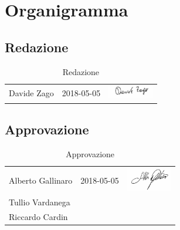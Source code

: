 \section{Organigramma}
	\subsection{Redazione}
	\begin{table}[H]
	\centering
	\begin{tabular}{|p{4cm}|C{4cm}|C{5cm}|}
	\hline
		 & & \\
		\hline
		Davide Zago & 2018-05-05 & \includegraphics[width=2cm]{../../CommonImages/firme/davide.png} \\
		\hline
	\end{tabular}
	\caption{Redazione}
	\end{table}
	
	\subsection{Approvazione}
	\begin{table}[H]
		\centering
		\begin{tabular}{|p{4cm}|C{4cm}|C{5cm}|}
			\hline
			 & & \\
			\hline			
			Alberto Gallinaro & 2018-05-05 & \includegraphics[width=2cm]{../../CommonImages/firme/alberto.png}  \\
			\hline
			Tullio Vardanega &  &  \\
			\hline
			Riccardo Cardin &  &  \\
			\hline
		\end{tabular}
		\caption{Approvazione}
	\end{table}
	
